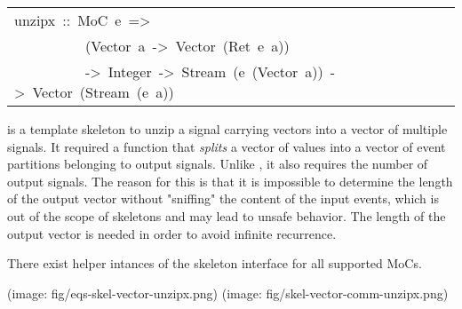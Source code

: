 \begin{haddockdesc}
\item[\begin{tabular}{@{}l}
unzipx\ ::\ MoC\ e\ =>\\\ \ \ \ \ \ \ \ \ \ (Vector\ a\ ->\ Vector\ (Ret\ e\ a))\\\ \ \ \ \ \ \ \ \ \ ->\ Integer\ ->\ Stream\ (e\ (Vector\ a))\ ->\ Vector\ (Stream\ (e\ a))
\end{tabular}]\haddockbegindoc
{} is a template skeleton to unzip a signal carrying
 vectors into a vector of multiple signals. It required a function
 that \emph{splits} a vector of values into a vector of event partitions
 belonging to output signals. Unlike , it also requires the
 number of output signals. The reason for this is that it is
 impossible to determine the length of the output vector without
 "sniffing" the content of the input events, which is out of the
 scope of skeletons and may lead to unsafe behavior. The length of
 the output vector is needed in order to avoid infinite recurrence.\par
There exist helper intances of the  skeleton interface for
 all supported MoCs.\par
(image: fig/eqs-skel-vector-unzipx.png)
 (image: fig/skel-vector-comm-unzipx.png)\par

\end{haddockdesc}
